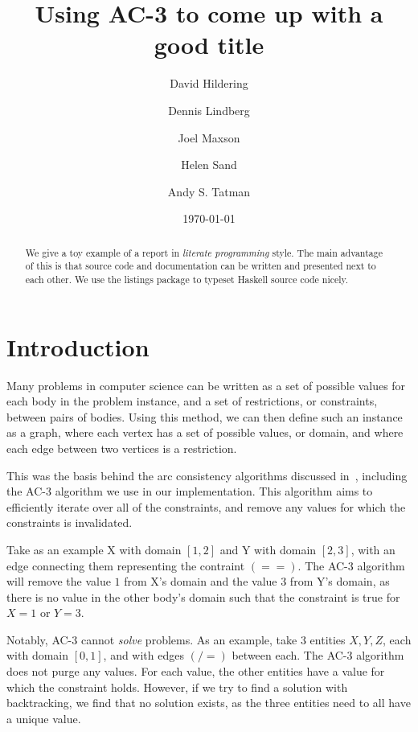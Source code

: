\documentclass[12pt,a4paper]{article}
\title{Using AC-3 to come up with a good title}
\author{David Hildering \and Dennis Lindberg \and Joel Maxson \and Helen Sand \and Andy S. Tatman}
\date{\today}
\begin{document}
\maketitle

\begin{abstract}
We give a toy example of a report in \emph{literate programming} style.
The main advantage of this is that source code and documentation can
be written and presented next to each other.
We use the listings package to typeset Haskell source code nicely.
\end{abstract}

\vfill

\tableofcontents

\clearpage


% 

\section{Introduction}
Many problems in computer science can be written as a set of possible values for each 
body in the problem instance, and a set of restrictions, or constraints, between pairs of bodies.
Using this method, we can then define such an instance as a graph, where each vertex has a set of possible values, or domain,
and where each edge between two vertices is a restriction.  

This was the basis behind the arc consistency algorithms discussed in~\cite{AC3}, including the AC-3 algorithm 
we use in our implementation. 
This algorithm aims to efficiently iterate over all of the constraints, and remove any values for which the constraints is invalidated.

Take as an example X with domain $[1,2]$ and Y with domain $[2,3]$, with an edge connecting them representing the contraint $(==)$.
The AC-3 algorithm will remove the value $1$ from X's domain and the value $3$ from Y's domain, 
as there is no value in the other body's domain such that the constraint is true for $X=1$ or $Y=3$.


Notably, AC-3 cannot \emph{solve} problems. As an example, take 3 entities $X,Y,Z$, 
each with domain $[0,1]$, and with edges $(/=)$ between each. 
The AC-3 algorithm does not purge any values. For each value, the other entities have a 
value for which the constraint holds.
However, if we try to find a solution with backtracking, we find that no solution exists, as 
the three entities need to all have a unique value. 
\end{document}
